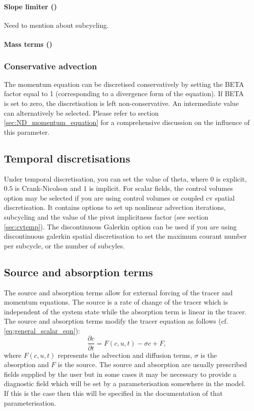 \paragraph{Slope limiter ()}
Need to mention about subcycling.
\paragraph{Mass terms ()}

\subsubsection{Conservative advection}

The momentum equation can be discretised conservatively by setting the
BETA factor equal to 1 (corresponding to a divergence form of the
equation). If BETA is set to zero, the discretisation is left
non-conservative. An intermediate value can alternatively be
selected. Please refer to section \ref{sec:ND_momentum_equation} for a comprehensive discussion on the influence of this parameter.


\subsection{Temporal discretisations}
\label{sec:configuring_fluidity_temporal_discretisation}
Under temporal discretisation, you can set the value of theta, where $0$ is explicit, $0.5$ is Crank-Nicolson and $1$ is implicit. For scalar fields, the control volumes option may be selected if you are using control volumes or coupled cv spatial discretisation.  It contains options to set up nonlinear advection iterations, subcycling and the value of the pivot implicitness factor (see section \ref{sec:cvtemp}). The discontinuous Galerkin option can be used if you are using discontinuous galerkin spatial discretisation to set the maximum courant number per subcycle, or the number of subcyles. 

\subsection{Source and absorption terms}\label{sec:Source}

The source and absorption terms allow for external forcing of the tracer and
momentum equations. The source is a rate of change of the tracer which is
independent of the system state while the absorption term is linear in the
tracer. The source and absorption terms modify the tracer
equation as follows (cf. \eqref{eq:general_scalar_eqn}):
\begin{equation}
  \frac{\partial c}{\partial t} = F(c,u,t) - \sigma c + F,
\end{equation}
where $F(c,u,t)$ represents the advection and diffusion terms, $\sigma$ is the
absorption and $F$ is the source. The source and absorption are usually
prescribed fields supplied by the user but in some cases it may be necessary
to provide a diagnostic field which will be set by a parameterisation
somewhere in the model. If this is the case then this will be specified in
the documentation of that parameterisation.

